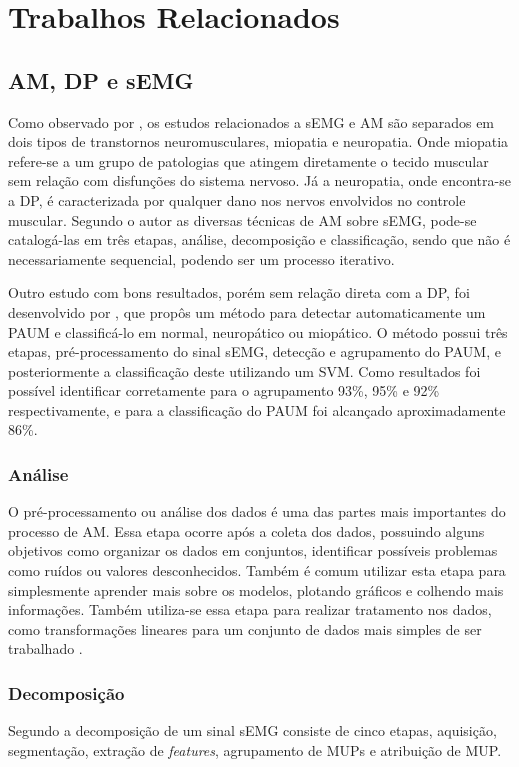 \chapter{Trabalhos Relacionados}
\label{ch:TrabalhosRelacionados}

\section{AM, DP e sEMG}
Como observado por , os estudos relacionados a sEMG e AM são separados em  dois tipos de transtornos neuromusculares, miopatia e neuropatia. Onde miopatia refere-se a um grupo de patologias que atingem diretamente o tecido muscular sem relação com disfunções do sistema nervoso. Já a neuropatia, onde encontra-se a DP, é caracterizada por qualquer dano nos nervos envolvidos no controle muscular. Segundo o autor  as diversas técnicas de AM sobre sEMG, pode-se catalogá-las em três etapas, análise, decomposição e classificação, sendo que não é necessariamente sequencial, podendo ser um processo iterativo.

Outro estudo com bons resultados, porém sem relação direta com a DP, foi desenvolvido por , que propôs um método para detectar automaticamente um PAUM e classificá-lo em normal, neuropático ou miopático. O método possui três etapas, pré-processamento do sinal sEMG, detecção e agrupamento do PAUM, e posteriormente a classificação deste utilizando um SVM. Como resultados foi possível identificar corretamente para o agrupamento 93\%, 95\% e 92\% respectivamente, e para a classificação do PAUM foi alcançado aproximadamente 86\%. 

\subsection{Análise}
O pré-processamento ou análise dos dados é uma das partes mais importantes do processo de AM. Essa etapa ocorre após a coleta dos dados, possuindo alguns objetivos como organizar os dados em conjuntos, identificar possíveis problemas como ruídos ou valores desconhecidos. Também é comum utilizar esta etapa para simplesmente aprender mais sobre os modelos, plotando gráficos e colhendo mais informações. Também utiliza-se essa etapa para realizar tratamento nos dados, como transformações lineares para um conjunto de dados mais simples de ser trabalhado \cite{batista2003pre}. 

\subsection{Decomposição}
Segundo  a decomposição de um sinal sEMG consiste de cinco etapas, aquisição, segmentação, extração de \textit{features}, agrupamento de MUPs e atribuição de MUP.

